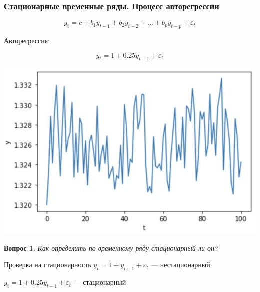 \documentclass[fullscreen=true, bookmarks=true, hyperref={pdfencoding=unicode}]{beamer}
\newtheorem*{question}{Вопрос}
\begin{document}
\begin{frame}
  \frametitle{Стационарные временные ряды. Процесс авторегрессии}

  $$ y_t = c + b_1y_{t-1} + b_2y_{t-2} + \dots + b_py_{t-p} + \varepsilon_t $$

  Авторегрессия:

  $$ y_t = 1 + 0.25y_{t-1} + \varepsilon_t $$

  \begin{center}
    \includegraphics[keepaspectratio,
                     width=.6\paperwidth]{autoregression.jpg}
  \end{center}
\end{frame}


\begin{frame}
  \begin{question}
    Как определить по временному ряду стационарный ли он?
  \end{question}
  \pause
  \begin{block}{Проверка на стационарность}
    $y_t = 1 + y_{t-1} + \varepsilon_t$ — нестационарный

    $y_t = 1 + 0.25y_{t-1} + \varepsilon_t$ — стационарный
  \end{block}
\end{frame}
\end{document}
